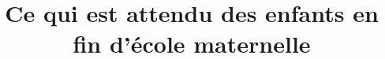 \documentclass{article}
\title{Ce qui est attendu des enfants en fin d’école maternelle}
\date{}
\begin{document}
\maketitle
\renewcommand{\contentsname}{Sommaire}
\tableofcontents

\end{document}
